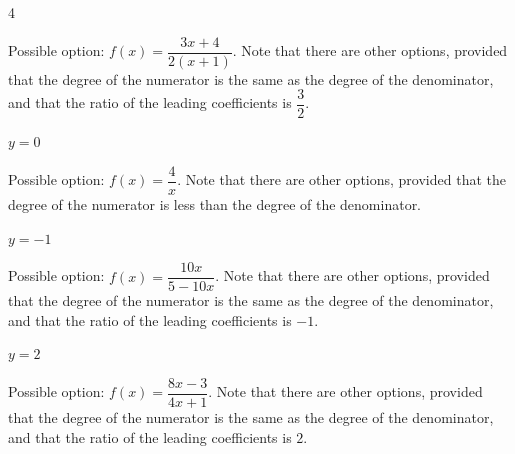 \begin{exercises}
\begin{problem}
\begin{multicols}{4}
\begin{subproblem}
\begin{shortsolution}
				 Possible option: $f(x)=\dfrac{3x+4}{2(x+1)}$. Note that there
				 are other options, provided that the degree of the numerator is the same as the degree
				 of the denominator, and that the ratio of the leading
				 coefficients is $\dfrac{3}{2}$.
			 \end{shortsolution}
		 \end{subproblem}
		 \begin{subproblem}
			 $y=0$
			 \begin{shortsolution}
				 Possible option: $f(x)=\dfrac{4}{x}$. Note that there
				 are other options, provided that the degree of the numerator is less than the degree
				 of the denominator.
			 \end{shortsolution}
		 \end{subproblem}
		 \begin{subproblem}
			 $y=-1$
			 \begin{shortsolution}
				 Possible option: $f(x)=\dfrac{10x}{5-10x}$. Note that there
				 are other options, provided that the degree of the numerator is the same as the degree
				 of the denominator, and that the ratio of the leading
				 coefficients is $-1$.
			 \end{shortsolution}
		 \end{subproblem}
		 \begin{subproblem}
			 $y=2$
			 \begin{shortsolution}
				 Possible option: $f(x)=\dfrac{8x-3}{4x+1}$. Note that there
				 are other options, provided that the degree of the numerator is the same as the degree
				 of the denominator, and that the ratio of the leading
				 coefficients is $2$.
			 \end{shortsolution}
		 \end{subproblem}
	 \end{multicols}
	 \end{problem}


\end{exercises}
